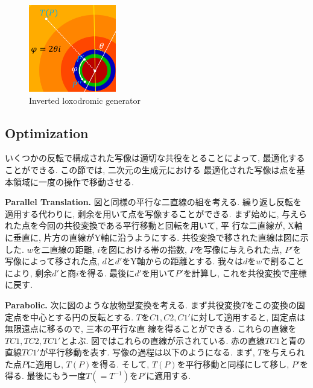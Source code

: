 \begin{figure}[h!tbp]
  \hspace*{\fill}
 \begin{minipage}[t]{0.24\hsize}
   \begin{center}
    \includegraphics[width=1.5in, height=1.5in, keepaspectratio]{../img/klein/2diis/loxodromicModRotation.pdf}
   \end{center}
   \caption{Inverted loxodromic generator}
   \label{fig:loxodromicRotationMod}
  \hspace*{\fill}
 \end{minipage}
\end{figure}

\subsection{Optimization}

いくつかの反転で構成された写像は適切な共役をとることによって, 最適化する
ことができる.
この節では, 二次元の生成元における
最適化された写像は点を基本領域に一度の操作で移動させる.

\noindent\textbf{Parallel Translation.}
図と同様の平行な二直線の組を考える.
繰り返し反転を適用する代わりに, 剰余を用いて点を写像することができる.
まず始めに, 与えられた点を今回の共役変換である平行移動と回転を用いて, 平
行な二直線が, X軸に垂直に, 片方の直線がY軸に沿うようにする.
共役変換で移された直線は図に示した.
$w$を二直線の距離, $i$を図における帯の指数, $P$を写像に与えられた点,
$P'$を写像によって移された点, $d$と$d'$をY軸からの距離とする.
我々は$d$を$w$で割ることにより, 剰余$d'$と商$i$を得る.
最後に$d'$を用いて$P'$を計算し, これを共役変換で座標に戻す.

\noindent\textbf{Parabolic.}
次に図のような放物型変換を考える.
まず共役変換$T$をこの変換の固定点を中心とする円の反転とする.
$T$を$C1,C2,C1'$に対して適用すると, 固定点は無限遠点に移るので, 三本の平行な直
線を得ることができる.
これらの直線を$TC1, TC2, TC1'$とよぶ.
図ではこれらの直線が示されている.
赤の直線$TC1$と青の直線$TC1'$が平行移動を表す.
写像の過程は以下のようになる.
まず, $T$を与えられた点$P$に適用し, $T(P)$を得る.
そして, $T(P)$を平行移動と同様にして移し, $P'$を得る.
最後にもう一度$T(= T^{-1})$を$P'$に適用する.

